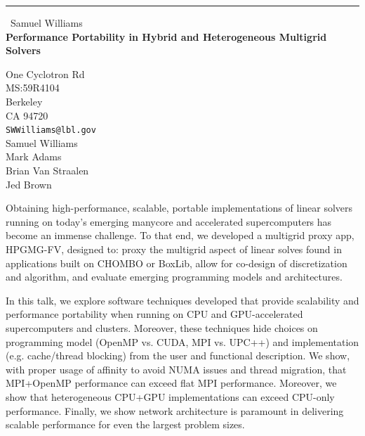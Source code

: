 \documentclass{report}
\begin{document}
\begin{center}
\rule{6in}{1pt} \
{\large Samuel Williams \\
{\bf Performance Portability in Hybrid and Heterogeneous Multigrid Solvers}}

One Cyclotron Rd \\ MS:59R4104 \\ Berkeley \\ CA 94720
\\
{\tt SWWilliams@lbl.gov}\\
Samuel Williams\\
Mark Adams\\
Brian Van Straalen\\
Jed Brown\end{center}

Obtaining high-performance, scalable, portable implementations of linear
solvers running on today's emerging manycore and accelerated
supercomputers has become an immense challenge. To that end, we developed
a multigrid proxy app, HPGMG-FV, designed to: proxy the multigrid aspect
of linear solves found in applications built on CHOMBO or BoxLib, allow
for co-design of discretization and algorithm, and evaluate emerging
programming models and architectures.

In this talk, we explore software techniques developed that provide
scalability and performance portability when running on CPU and
GPU-accelerated supercomputers and clusters. Moreover, these techniques
hide choices on programming model (OpenMP vs. CUDA, MPI vs. UPC++) and
implementation (e.g. cache/thread blocking) from the user and functional
description. We show, with proper usage of affinity to avoid NUMA issues
and thread migration, that MPI+OpenMP performance can exceed flat MPI
performance. Moreover, we show that heterogeneous CPU+GPU implementations
can exceed CPU-only performance. Finally, we show network architecture is
paramount in delivering scalable performance for even the largest problem
sizes.
\end{document}
